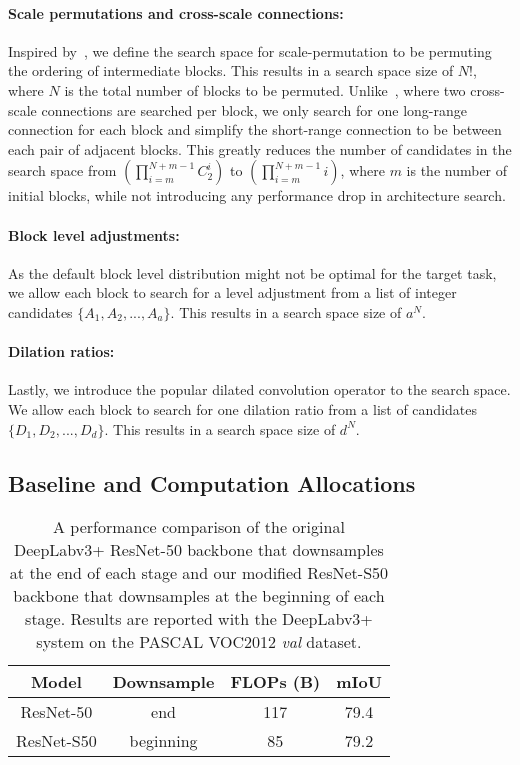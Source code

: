 \documentclass[10pt,twocolumn,letterpaper]{article}
\begin{document}
\paragraph{Scale permutations and cross-scale connections:} Inspired by~\cite{spinenet}, we define the search space for scale-permutation to be permuting the ordering of intermediate blocks. This results in a search space size of $N$!, where $N$ is the total number of blocks to be permuted. Unlike~\cite{spinenet}, where two cross-scale connections are searched per block, we only search for one long-range connection for each block and simplify the short-range connection to be between each pair of adjacent blocks. This greatly reduces the number of candidates in the search space from $(\prod_{i=m}^{N+m-1} C^i_2)$ to $(\prod_{i=m}^{N+m-1} i)$, where $m$ is the number of initial blocks, while not introducing any performance drop in architecture search.

\paragraph{Block level adjustments:} As the default block level distribution might not be optimal for the target task, we allow each block to search for a level adjustment from a list of integer candidates $\{A_1, A_2, ..., A_a\}$. This results in a search space size of $a^N$.



\paragraph{Dilation ratios:} Lastly, we introduce the popular dilated convolution operator to the search space. We allow each block to search for one dilation ratio from a list of candidates $\{D_1, D_2, ..., D_d\}$. This results in a search space size of $d^N$.

\subsection{Baseline and Computation Allocations}\label{sec:search_baseline}

\setlength{\tabcolsep}{4pt}
\begin{table}[h!]
\centering
\begin{tabular}{c| c | c  c}
  \toprule
  Model & Downsample & FLOPs (B) & mIoU  \\
  \midrule
  ResNet-50 & end & 117 & 79.4 \\
  ResNet-S50 & beginning & 85 & 79.2 \\
  \bottomrule
\end{tabular}
\caption{A performance comparison of the original DeepLabv3+ ResNet-50 backbone that downsamples at the end of each stage and our modified ResNet-S50 backbone that downsamples at the beginning of each stage. Results are reported with the DeepLabv3+ system on the PASCAL VOC2012 \textit{val} dataset.}
\label{tab:modified_deeplab_resnet} 
\end{table}
\end{document}

